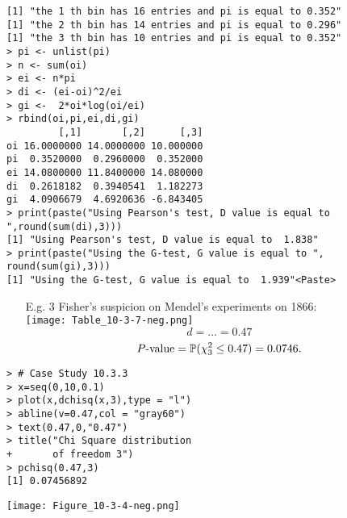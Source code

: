 \begin{frame}[fragile]
\begin{center}
\begin{minipage}{0.8\textwidth}
\begin{lstlisting}
[1] "the 1 th bin has 16 entries and pi is equal to 0.352"
[1] "the 2 th bin has 14 entries and pi is equal to 0.296"
[1] "the 3 th bin has 10 entries and pi is equal to 0.352"
> pi <- unlist(pi)
> n <- sum(oi)
> ei <- n*pi
> di <- (ei-oi)^2/ei
> gi <-  2*oi*log(oi/ei)
> rbind(oi,pi,ei,di,gi)
         [,1]       [,2]      [,3]
oi 16.0000000 14.0000000 10.000000
pi  0.3520000  0.2960000  0.352000
ei 14.0800000 11.8400000 14.080000
di  0.2618182  0.3940541  1.182273
gi  4.0906679  4.6920636 -6.843405
> print(paste("Using Pearson's test, D value is equal to ",round(sum(di),3)))
[1] "Using Pearson's test, D value is equal to  1.838"
> print(paste("Using the G-test, G value is equal to ", round(sum(gi),3)))
[1] "Using the G-test, G value is equal to  1.939"<Paste>
\end{lstlisting}
\end{minipage}
\vfill
{}
\end{center}
\end{frame}
\begin{frame}

\begin{enumerate}
\item[E.g. 3] Fisher's suspicion on Mendel's experiments on 1866:
\\
\texttt{[image: Table\_10-3-7-neg.png]}
\vfill
\[
d= ... = 0.47
\]
\vfill
\[
P\text{-value} = \mathbb{P}(\chi_{3}^2 \le 0.47) = 0.0746.
\]
\end{enumerate}
\end{frame}
\begin{frame}[fragile]

\begin{minipage}{0.4\textwidth}
\centering
\begin{lstlisting}
> # Case Study 10.3.3
> x=seq(0,10,0.1)
> plot(x,dchisq(x,3),type = "l")
> abline(v=0.47,col = "gray60")
> text(0.47,0,"0.47")
> title("Chi Square distribution
+       of freedom 3")
> pchisq(0.47,3)
[1] 0.07456892
\end{lstlisting}
\end{minipage}
\hfill
\begin{minipage}{0.5\textwidth}
\centering
\texttt{[image: Figure\_10-3-4-neg.png]}
\end{minipage}

\end{frame}
